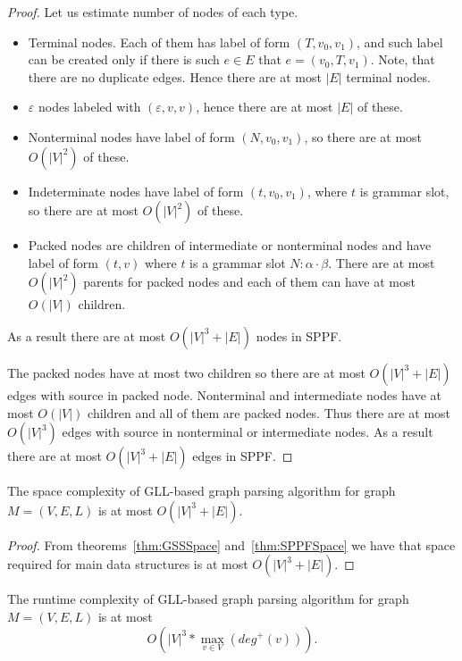 \begin{proof}
Let us estimate number of nodes of each type.
\begin{itemize}
\item Terminal nodes. 
Each of them has label of form $(T, v_0, v_1)$, and such label can be created only if there is such $e \in E$ that $e=(v_0,T,v_1)$. 
Note, that there are no duplicate edges. 
Hence there are at most $|E|$ terminal nodes.
\item $\varepsilon$ nodes labeled with $(\varepsilon, v ,v)$, hence there are at most $|E|$ of these. 
\item Nonterminal nodes have label of form $(N,v_0,v_1)$, so there are at most $O(|V|^2)$ of these.
\item Indeterminate nodes have label of form $(t,v_0,v_1)$, where $t$ is grammar slot, so there are at most $O(|V|^2)$ of these.
\item Packed nodes are children of intermediate or nonterminal nodes and have label of form $(t,v)$ where $t$ is a grammar slot $N : \alpha \cdot \beta$.
There are at most $O(|V|^2)$ parents for packed nodes and each of them can have at most $O(|V|)$ children.
\end{itemize}

As a result there are at most $O(|V|^3 + |E|)$ nodes in SPPF.

The packed nodes have at most two children so there are at most $O(|V|^3 + |E|)$ edges with source in packed node. 
Nonterminal and intermediate nodes have at most $O(|V|)$ children and all of them are packed nodes.
Thus there are at most $O(|V|^3)$ edges with source in nonterminal or intermediate nodes. As a result there are at most $O(|V|^3 + |E|)$ edges in SPPF.


\end{proof}

\begin{mytheorem}
The space complexity of GLL-based graph parsing algorithm for graph $M=(V,E,L)$ is at most $O(|V|^3 + |E|)$.
\end{mytheorem}

\begin{proof}

From theorems~\ref{thm:GSSSpace} and~\ref{thm:SPPFSpace} we have that space required for main data structures is at most $O(|V|^3 + |E|)$. 

\end{proof}


\begin{mytheorem}\label{thm:complexity}
The runtime complexity of GLL-based graph parsing algorithm for graph $M=(V,E,L)$ is at most $$O\left(|V|^3*\max\limits_{v \in V}\left(deg^+\left(v\right)\right)\right).$$
\end{mytheorem}

